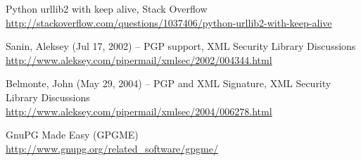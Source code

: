 \begin{thebibliography}{99}
Python urllib2 with keep alive, Stack Overflow\\
\url{http://stackoverflow.com/questions/1037406/python-urllib2-with-keep-alive}

Sanin, Aleksey (Jul 17, 2002) -- PGP support, XML Security Library Discussions\\
\url{http://www.aleksey.com/pipermail/xmlsec/2002/004344.html}

Belmonte, John (May 29, 2004) -- PGP and XML Signature, XML Security Library Discussions\\
\url{http://www.aleksey.com/pipermail/xmlsec/2004/006278.html}

GnuPG Made Easy (GPGME)\\
\url{http://www.gnupg.org/related_software/gpgme/}

\end{thebibliography}

